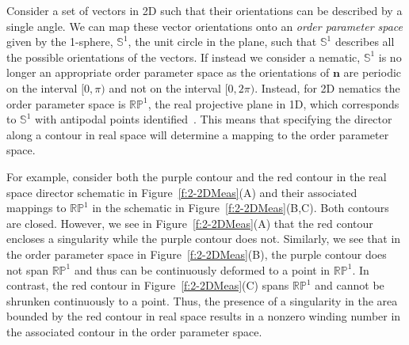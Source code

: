 Consider a set of vectors in 2D such that their orientations can be described by a single angle.
We can map these vector orientations onto an \emph{order parameter space} given by the 1-sphere, $\mathbb{S}^1$, the unit circle in the plane, such that $\mathbb{S}^1$ describes all the possible orientations of the vectors.
If instead we consider a nematic, $\mathbb{S}^1$ is no longer an appropriate order parameter space as the orientations of $\mathbf{n}$ are periodic on the interval $[0,\pi)$ and not on the interval $[0,2 \pi)$.
Instead, for 2D nematics the order parameter space is $\mathbb{R}\mathbb{P}^1$, the real projective plane in 1D, which corresponds to $\mathbb{S}^1$ with antipodal points identified~\cite{RN196,RN153,RN236}.
This means that specifying the director along a contour in real space will determine a mapping to the order parameter space.

For example, consider both the purple contour and the red contour in the real space director schematic in Figure~\ref{f:2-2DMeas}(A) and their associated mappings to $\mathbb{R}\mathbb{P}^1$ in the schematic in Figure~\ref{f:2-2DMeas}(B,C).
Both contours are closed.
However, we see in Figure~\ref{f:2-2DMeas}(A) that the red contour encloses a singularity while the purple contour does not.
Similarly, we see that in the order parameter space in Figure~\ref{f:2-2DMeas}(B), the purple contour does not span $\mathbb{RP}^1$ and thus can be continuously deformed to a point in $\mathbb{R}\mathbb{P}^1$.
In contrast, the red contour in Figure~\ref{f:2-2DMeas}(C) spans $\mathbb{RP}^1$ and cannot be shrunken continuously to a point.
Thus, the presence of a singularity in the area bounded by the red contour in real space results in a nonzero winding number in the associated contour in the order parameter space.


